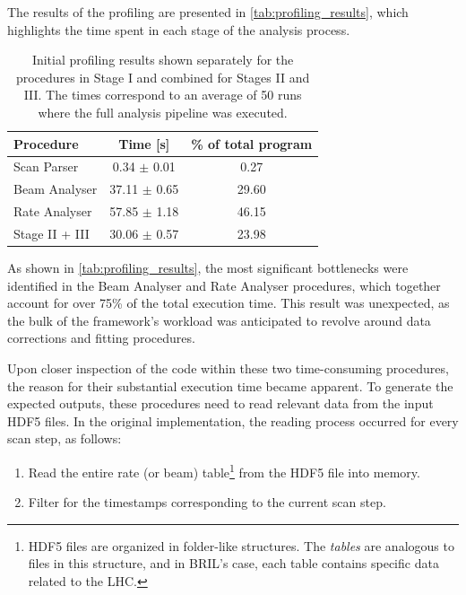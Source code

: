 The results of the profiling are presented in \autoref{tab:profiling_results}, which highlights the time spent in each stage of the analysis process.

\begin{table}[!htb]
	\centering
	\caption{Initial profiling results shown separately for the procedures in Stage I and combined for Stages II and III. The times correspond to an average of 50 runs where the full analysis pipeline was executed.}
	\begin{tabular}{|l|c|c|}
		\hline
		\textbf{Procedure} & \textbf{Time [s]} & \textbf{\% of total program} \\
		\hline
		Scan Parser        & 0.34 $\pm$ 0.01   & 0.27                         \\
		Beam Analyser      & 37.11 $\pm$ 0.65  & 29.60                        \\
		Rate Analyser      & 57.85 $\pm$ 1.18  & 46.15                        \\
		Stage II + III     & 30.06 $\pm$ 0.57  & 23.98                        \\
		\hline
	\end{tabular}
	\label{tab:profiling_results}
\end{table}

As shown in \autoref{tab:profiling_results}, the most significant bottlenecks were identified in the Beam Analyser and Rate Analyser procedures, which together account for over 75\% of the total execution time. This result was unexpected, as the bulk of the framework’s workload was anticipated to revolve around data corrections and fitting procedures.

Upon closer inspection of the code within these two time-consuming procedures, the reason for their substantial execution time became apparent. To generate the expected outputs, these procedures need to read relevant data from the input HDF5 files. In the original implementation, the reading process occurred for every scan step, as follows:

\begin{enumerate}
	\item Read the entire rate (or beam) table\footnote{HDF5 files are organized in folder-like structures. The \textit{tables} are analogous to files in this structure, and in BRIL's case, each table contains specific data related to the LHC.} from the HDF5 file into memory.
	\item Filter for the timestamps corresponding to the current scan step.
\end{enumerate}


